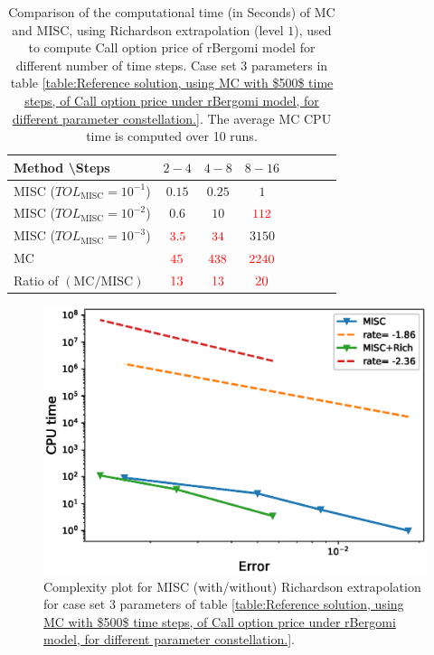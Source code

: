 \begin{table}[h!]
	\centering
	\begin{tabular}{l*{6}{c}r}
		Method \textbackslash  Steps            & $2-4$ & $4-8$ & $8-16$ &   \\
		\hline
		MISC ($TOL_{\text{MISC}}=10^{-1}$)   & $0.15$ & $0.25$ & $1$  \\
		MISC ($TOL_{\text{MISC}}=10^{-2}$)   & $0.6$ & $10$ & ${\color{red}112}$  \\
		MISC ($TOL_{\text{MISC}}=10^{-3}$)  & ${\color{red}3.5}$ & ${\color{red}34}$ & $3150$ \\
		\hline	
			MC  & ${\color{red}45}$  & ${\color{red}438}$  & ${\color{red}2240}$ \\
			
			\hline
				Ratio of $\left(\text{MC}/ \text{MISC} \right)$   & ${\color{red}13}$  & ${\color{red}13}$  & ${\color{red}20}$ \\

		\hline
	\end{tabular}
	\caption{Comparison of the computational time (in Seconds) of  MC and MISC, using Richardson extrapolation (level $1$), used to compute Call option price of rBergomi model for different number of time steps. Case set $3$ parameters in table \ref{table:Reference solution, using MC with $500$ time steps, of Call option price under rBergomi model, for different parameter constellation.}. The
average MC CPU time is computed over 10 runs.}
	\label{Comparsion of the computational time of  MC and MISC, using Richardson extrapolation (level $1$), used to compute Call option price of rBergomi model for different number of time steps. Case set $3$ parameters}
\end{table}

\FloatBarrier


	\begin{figure}[h!]
	\centering
	\includegraphics[width=0.4\linewidth]{./figures/rBergomi_Complexity_rates/set5/error_vs_time_set5_comparison}
	
	\caption{Complexity plot for  MISC (with/without) Richardson extrapolation for case set $3$ parameters of table \ref{table:Reference solution, using MC with $500$ time steps, of Call option price under rBergomi model, for different parameter constellation.}.}
	\label{fig:Complexity plot for  MISC for case set $3$ parameters, comparison}
\end{figure}


